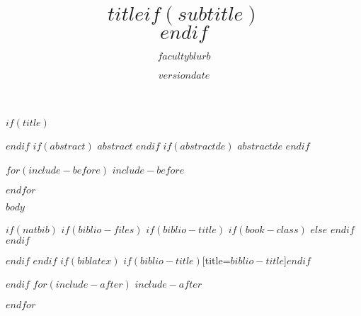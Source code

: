 \documentclass[$if(fontsize)$$fontsize$,$endif$$if(lang)$$lang$,$endif$$if(papersize)$$papersize$,$endif$$for(classoption)$$classoption$$sep$,$endfor$]{$documentclass$}
\title{$title$$if(subtitle)$\\\vspace{0.5em}{\large $subtitle$}$endif$}
\author{\parbox{\textwidth}{\normalsize\centering
  { $facultyblurb$ }}}
\date{$version$}
\date{$date$}
\begin{document}
$if(title)$
\maketitle
$endif$
$if(abstract)$
$abstract$
$endif$
$if(abstractde)$
$abstractde$
$endif$

$for(include-before)$
$include-before$

$endfor$

\cleardoublepage
\tableofcontents
\newpage
\cleardoublepage
\listoffigures
\cleardoublepage
{}
\setcounter{page}{1}
\cleardoubleoddpage

$body$

$if(natbib)$
$if(biblio-files)$
$if(biblio-title)$
$if(book-class)$
\renewcommand\bibname{$biblio-title$}
$else$
\renewcommand\refname{$biblio-title$}
$endif$
$endif$


$endif$
$endif$
$if(biblatex)$
\printbibliography$if(biblio-title)$[title=$biblio-title$]$endif$

$endif$
$for(include-after)$
$include-after$

$endfor$
\end{document}
